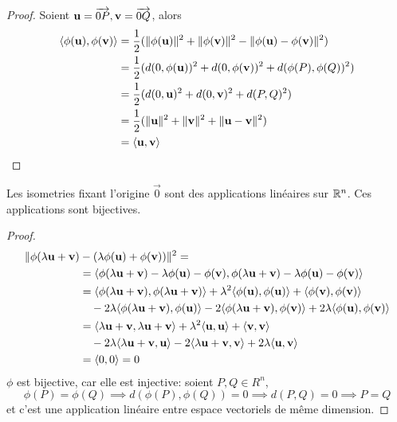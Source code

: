 \begin{proof}
	Soient $\mathbf{u} = \overrightarrow{0P}, \mathbf{v} = \overrightarrow{0Q}$, alors
	\begin{align*}
		\langle \phi(\mathbf{u}), \phi(\mathbf{v}) \rangle &= \frac{1}{2}(\|\phi(\mathbf{u})\|^2 +	
		\|\phi(\mathbf{v})\|^2 - \| \phi(\mathbf{u}) - \phi(\mathbf{v}) \|^2)\\
		&= \frac{1}{2}(d(0, \phi(\mathbf{u}))^2 + d(0,  \phi(\mathbf{v}))^2 + d(\phi(P), \phi(Q))^2)\\
		&= \frac{1}{2}(d(0, \mathbf{u})^2 + d(0, \mathbf{v})^2 + d(P, Q)^2)\\
		&= \frac{1}{2}(\| \mathbf{u} \|^2 + \| \mathbf{v} \|^2
			+ \|\mathbf{u} - \mathbf{v}\|^2)\\
		&= \langle \mathbf{u}, \mathbf{v} \rangle
	\end{align*}
\end{proof}

\begin{theorem}
	Les isometries fixant l'origine $\vec{0}$ sont des applications linéaires sur
	$\mathbb{R}^n$. Ces applications sont bijectives.
\end{theorem}

\begin{proof}
	\begin{align*}
		\| \phi(\lambda \mathbf{u} + \mathbf{v})
		&- (\lambda \phi(\mathbf{u}) + \phi(\mathbf{v}))\|^2 =\\
		&= \langle \phi(\lambda \mathbf{u} + \mathbf{v})
		- \lambda \phi(\mathbf{u}) - \phi(\mathbf{v}), \phi(\lambda \mathbf{u} + \mathbf{v})
		- \lambda \phi(\mathbf{u}) - \phi(\mathbf{v}) \rangle
		\\
		&= \langle \phi(\lambda \mathbf{u} + \mathbf{v}), \phi(\lambda \mathbf{u} + \mathbf{v}) \rangle
		+ \lambda^2 \langle \phi(\mathbf{u}), \phi(\mathbf{u}) \rangle
		+ \langle \phi(\mathbf{v}), \phi(\mathbf{v}) \rangle\\
		&\quad- 2\lambda\langle \phi(\lambda\mathbf{u} + \mathbf{v}), \phi(\mathbf{u}) \rangle
		- 2\langle \phi(\lambda\mathbf{u} + \mathbf{v}), \phi(\mathbf{v}) \rangle
		+ 2\lambda\langle \phi(\mathbf{u}), \phi(\mathbf{v}) \rangle
		\\
		&= \langle \lambda \mathbf{u} + \mathbf{v}, \lambda \mathbf{u} + \mathbf{v} \rangle
		+ \lambda^2 \langle \mathbf{u}, \mathbf{u} \rangle
		+ \langle \mathbf{v}, \mathbf{v} \rangle\\
		&\quad- 2\lambda\langle \lambda\mathbf{u} + \mathbf{v}, \mathbf{u} \rangle
		- 2\langle \lambda\mathbf{u} + \mathbf{v}, \mathbf{v} \rangle
		+ 2\lambda\langle \mathbf{u}, \mathbf{v} \rangle
		\\
		&= \langle 0, 0 \rangle = 0
	\end{align*}
	$\phi$ est bijective, car elle est injective: soient $P, Q \in R^n$,
	\begin{equation*}
		\phi(P) = \phi(Q) \implies d(\phi(P), \phi(Q)) = 0 \implies
		d(P, Q) = 0 \implies P = Q
	\end{equation*}
	et c'est une application linéaire entre espace vectoriels de même dimension.
\end{proof}

